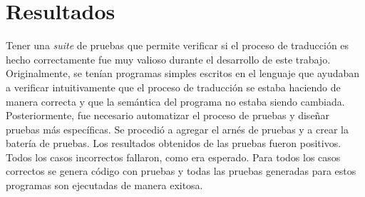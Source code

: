 \begin{comment}
\begin{figure}
\begin{lstlisting}
#!/bin/bash

TEST_NAMES=(bubblesort_test count_test fact_test fib_test
  mergesort_test min_test occurs_test quicksort_test selection_test
  strlen_test plus_test subst_test outer_scope_test local_scope_test
  global_scope_test global_scope2_test mod_test div_test mult_test
  less_test and_test or_test not_test eq_test new_test deref_test
  while_test returnv_test linked_list_test cyclic_linked_list_test)

for test_name in ${TEST_NAMES[@]}
do
  res=$(./${test_name});
  ret=$?

if [[ ${res} == Failed* ]];
  then
    echo -e "\e[31mFAILED: \e[39m${res}"
else
  case ${ret} in

  1) echo -e "\e[31mError\e[39m (general error)
    occurred in the execution of ${test_name}";;
  2) echo -e "\e[31mError\e[39m (misuse of shell builtins)
    occurred in the execution of ${test_name}";;
  3) echo -e "\e[31mMemory allocation error\e[39m ocurred
    in execution of ${test_name}";;
  126) echo -e "\e[31mError\e[39m (command invoked cannot execute)
    occurred in the execution of ${test_name}";;
  127) echo -e "\e[31mError\e[39m (command not found)
    occurred in the execution of ${test_name}";;
  128) echo -e "\e[31mError\e[39m (invalid argument given to exit)
    occurred in the execution of ${test_name}";;
  130) echo -e "\e[31mError\e[39m (program terminated by Ctrl+C)
    occurred in the execution of ${test_name}";;
  139) echo -e "\e[31mSegmentation fault\e[39m ocurred
    in execution of ${test_name}";;
  *) echo ${res};;
  esac
fi
done
\end{lstlisting}

\caption{\textit{Shell script} para la ejecución de pruebas}
\label{fig:bash_script}
\end{figure}
\end{comment}

\section{Resultados}\label{section:results}

Tener una \textit{suite} de pruebas que permite verificar si el proceso de traducción es hecho correctamente fue muy valioso durante el desarrollo de este trabajo.
Originalmente, se tenían programas simples escritos en el lenguaje que ayudaban a verificar intuitivamente que el proceso de traducción se estaba haciendo de manera correcta y que la semántica del programa no estaba siendo cambiada.
Posteriormente, fue necesario automatizar el proceso de pruebas y diseñar pruebas más específicas.
Se procedió a agregar el arnés de pruebas y a crear la batería de pruebas.
Los resultados obtenidos de las pruebas fueron positivos.
Todos los casos incorrectos fallaron, como era esperado.
Para todos los casos correctos se genera código con pruebas y todas las pruebas generadas para estos programas son ejecutadas de manera exitosa.

